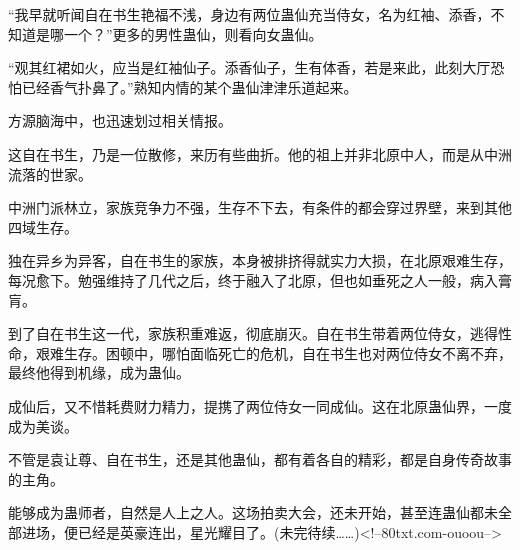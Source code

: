 \begin{this_body}
“我早就听闻自在书生艳福不浅，身边有两位蛊仙充当侍女，名为红袖、添香，不知道是哪一个？”更多的男性蛊仙，则看向女蛊仙。

“观其红裙如火，应当是红袖仙子。添香仙子，生有体香，若是来此，此刻大厅恐怕已经香气扑鼻了。”熟知内情的某个蛊仙津津乐道起来。

方源脑海中，也迅速划过相关情报。

这自在书生，乃是一位散修，来历有些曲折。他的祖上并非北原中人，而是从中洲流落的世家。

中洲门派林立，家族竞争力不强，生存不下去，有条件的都会穿过界壁，来到其他四域生存。

独在异乡为异客，自在书生的家族，本身被排挤得就实力大损，在北原艰难生存，每况愈下。勉强维持了几代之后，终于融入了北原，但也如垂死之人一般，病入膏肓。

到了自在书生这一代，家族积重难返，彻底崩灭。自在书生带着两位侍女，逃得性命，艰难生存。困顿中，哪怕面临死亡的危机，自在书生也对两位侍女不离不弃，最终他得到机缘，成为蛊仙。

成仙后，又不惜耗费财力精力，提携了两位侍女一同成仙。这在北原蛊仙界，一度成为美谈。

不管是袁让尊、自在书生，还是其他蛊仙，都有着各自的精彩，都是自身传奇故事的主角。

能够成为蛊师者，自然是人上之人。这场拍卖大会，还未开始，甚至连蛊仙都未全部进场，便已经是英豪连出，星光耀目了。(未完待续……)<!--80txt.com-ouoou-->

\end{this_body}

